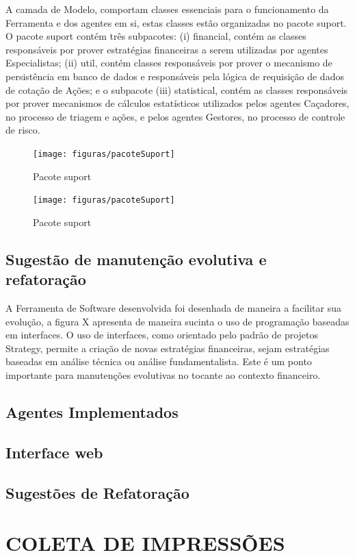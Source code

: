 A camada de Modelo, comportam classes  essenciais para o funcionamento da Ferramenta e dos agentes em si, estas classes estão organizadas no pacote suport. O pacote suport contém três subpacotes: (i) financial, contém as classes responsáveis por prover estratégias financeiras a serem utilizadas por agentes Especialistas; (ii) util, contém classes responsáveis por prover o mecanismo de persistência em banco de dados e responsáveis pela lógica de requisição de dados de cotação de Ações; e o subpacote (iii) statistical, contém as classes responsáveis por prover mecanismos de cálculos estatísticos utilizados pelos agentes Caçadores, no processo de triagem e ações, e pelos agentes Gestores, no processo de controle de risco.   

\begin{figure}[h]
\centering
\label{f33}
\texttt{[image: figuras/pacoteSuport]}
\caption{Pacote suport}
\end{figure}


\begin{figure}[h]
\centering
\label{f33}
\texttt{[image: figuras/pacoteSuport]}
\caption{Pacote suport}
\end{figure}
\subsection{Sugestão de manutenção evolutiva e refatoração}

A Ferramenta de Software desenvolvida foi desenhada de maneira a facilitar sua evolução, a figura X apresenta de maneira sucinta o uso de programação baseadas em interfaces. O uso de interfaces, como orientado pelo padrão de projetos Strategy, permite a criação de novas estratégias financeiras, sejam estratégias baseadas em análise técnica ou análise fundamentalista. Este é um ponto importante para manutenções evolutivas no tocante ao contexto financeiro.


\subsection{Agentes Implementados}
\subsection{Interface web}
\subsection{Sugestões de Refatoração}


\section{COLETA DE IMPRESSÕES}
